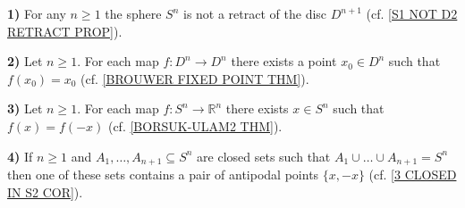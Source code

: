 \documentclass[11pt, letterpaper, oneside]{report}
\theoremstyle{pplain}
\theoremstyle{ddefinition}
\theoremstyle{nnn}
\theoremstyle{eexercise}
\newcommand{\R}{{\mathbb R}}
\begin{document}






\textbf{1)} For any $n\geq 1$ the sphere $S^{n}$ is not a retract of the disc $D^{n+1}$ 
(cf. \ref{S1 NOT D2 RETRACT PROP}).  

\textbf{2)} Let $n\geq 1$. For each map $f\colon D^{n} \to D^{n}$ there exists a point
$x_{0}\in D^{n}$ such that $f(x_{0}) = x_{0}$ (cf. \ref{BROUWER FIXED POINT THM}). 

\textbf{3)} Let $n\geq 1$. For each map $f\colon S^{n} \to \R^{n}$ there exists $x\in S^{n}$
such that $f(x) = f(-x)$ (cf. \ref{BORSUK-ULAM2 THM}). 

\textbf{4)}  If $n\geq 1$ and $A_{1}, \dots, A_{n+1}\subseteq S^{n}$ are closed sets such that 
$A_{1}\cup  \dots \cup  A_{n+1} = S^{n}$ then one of these sets contains a pair of antipodal points 
$\{x, -x\}$ (cf. \ref{3 CLOSED IN S2 COR}). 
\end{document}
